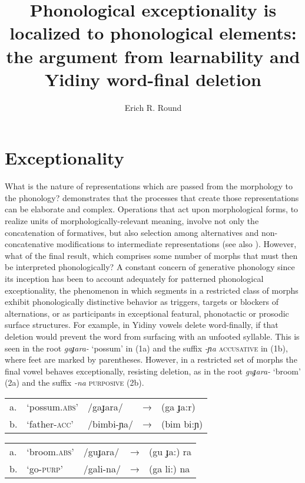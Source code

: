 \documentclass[output=paper,
modfonts
]{LSP/langsci}
\title{Phonological exceptionality is localized to phonological elements: the argument from learnability and Yidiny word-final deletion}
\author{%
Erich R. Round\affiliation{University of Queensland}
}
\begin{document}
\maketitle

\section[Exceptionality]{Exceptionality}

What is the nature of representations which are passed from the morphology to the phonology? \citet{anderson1992} demonstrates that the processes that create those representations can be elaborate and complex. Operations that act upon morphological forms, to realize units of morphologically-relevant meaning, involve not only the concatenation of formatives, but also selection among alternatives and non-concatenative modifications to intermediate representations (see also \citealt{anderson2015,anderson2016,andersontoappearar}). However, what of the final result, which comprises some number of morphs that must then be interpreted phonologically? A constant concern of generative phonology since its inception has been to account adequately for patterned phonological exceptionality, the phenomenon in which segments in a restricted class of morphs exhibit phonologically distinctive behavior as triggers, targets or blockers of alternations, or as participants in exceptional featural, phonotactic or prosodic surface structures. For example, in Yidiny \citep{dixon1977a,dixon1977b} vowels delete word-finally, if that deletion would prevent the word from surfacing with an unfooted syllable. This is seen in the root \textit{gaɟara-} `possum' in (1a) and the suffix \textit{-ɲa} \textsc{accusative} in (1b), where feet are marked by parentheses. However, in a restricted set of morphs the final vowel behaves exceptionally, resisting deletion, as in the root \textit{guɟara-} `broom' (2a) and the suffix \textit{-na} \textsc{purposive} (2b).

\ea
\begin{tabular}[t]{@{}lllll}
a. & `possum.\textsc{abs}' & /gaɟara/ & → & (ga ɟa:r) \\
b. & `father-\textsc{acc}' & /bimbi-ɲa/ & → & (bim bi:ɲ) \\
\end{tabular}

\ex
\begin{tabular}[t]{@{}lllll}
a. & `broom.\textsc{abs}' & /guɟara/ & → & (gu ɟa:) ra \\
b. & `go-\textsc{purp}' & /gali-na/  & → & (ga li:) na\\
\end{tabular}
\z
\end{document}
